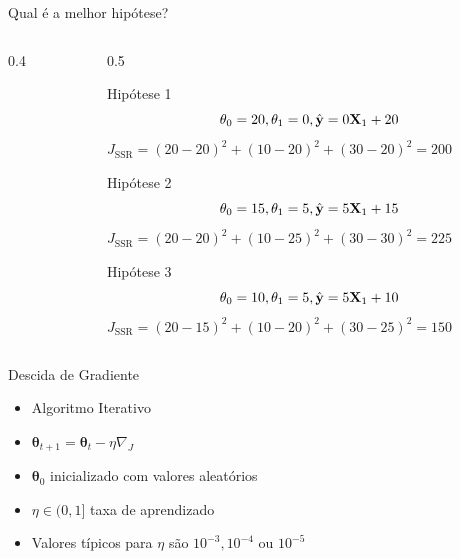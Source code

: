 \documentclass[aspectratio=169,xcolor=dvipsnames]{beamer}
\begin{document}
\begin{frame}{Qual é a melhor \alert{hipótese}?}
\begin{columns}[onlytextwidth]
\begin{column}{0.4\textwidth}
    \end{column}
    \begin{column}{0.5\textwidth}
        \begin{block}{ Hipótese 1}
        \scriptsize
            \[ \theta_0=20, \theta_1=0, \hat{\mathbf{y}}=0\mathbf{X}_1+20\]
            $J_{\text{SSR}}=(20-20)^2+(10-20)^2+(30-20)^2=200$
        \end{block}
        \begin{block}{ Hipótese 2}
        \scriptsize
            \[ \theta_0=15, \theta_1=5, \hat{\mathbf{y}}=5\mathbf{X}_1+15\]
            $J_{\text{SSR}}=(20-20)^2+(10-25)^2+(30-30)^2=225$
        \end{block}
        \begin{block}{ Hipótese 3}
        \scriptsize
            \[ \theta_0=10, \theta_1=5,\hat{\mathbf{y}}=5\mathbf{X}_1+10\]
            $J_{\text{SSR}}=(20-15)^2+(10-20)^2+(30-25)^2=150$
        \end{block}
    \end{column}
\end{columns}
\end{frame}

\begin{frame}{Descida de Gradiente}
\begin{itemize}
    \item Algoritmo Iterativo
    \item $\bm{\theta}_{t+1}=\bm{\theta}_{t}-\eta\nabla_ J$
    \item $\bm{\theta}_{0}$ inicializado com valores aleatórios
    \item $\eta\in(0,1]$ taxa de aprendizado
    \item Valores típicos para $\eta$ são $10^{-3}, 10^{-4}$ ou $10^{-5}$
\end{itemize}    
\end{frame}
\end{document}

